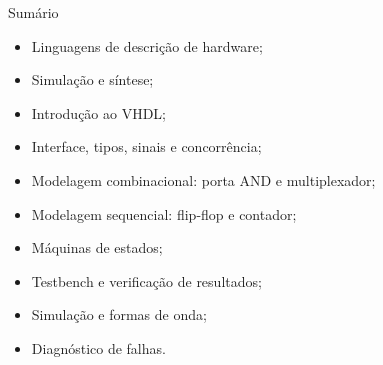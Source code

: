 \begin{frame}[t]{Sumário}
\begin{itemize}
\item Linguagens de descrição de hardware;
\item Simulação e síntese;
\item Introdução ao VHDL;
\item Interface, tipos, sinais e concorrência;
\item Modelagem combinacional: porta AND e multiplexador;
\item Modelagem sequencial: flip-flop e contador;
\item Máquinas de estados;
\item Testbench e verificação de resultados;
\item Simulação e formas de onda;
\item Diagnóstico de falhas.
\end{itemize}
\end{frame}
